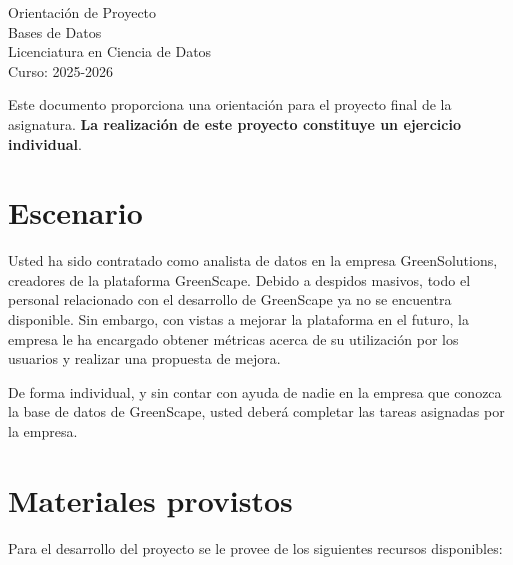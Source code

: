 \documentclass[10pt]{article}
\date{\displaydate{date}}
\begin{document}
	
	
	\begin{centering}
		
		\huge Orientación de Proyecto \\[2mm]
		
		\small Bases de Datos\\
		Licenciatura en Ciencia de Datos\\
		Curso: 2025-2026
		
	\end{centering}
	
	\vspace{2mm}
	
	Este documento proporciona una orientación para el proyecto final de la asignatura. \textbf{La realización de este proyecto constituye un ejercicio individual}.
	
	\section*{Escenario}
	
	Usted ha sido contratado como analista de datos en la empresa GreenSolutions, creadores de la plataforma GreenScape. Debido a despidos masivos, todo el personal relacionado con el desarrollo de GreenScape ya no se encuentra disponible. Sin embargo, con vistas a mejorar la plataforma en el futuro, la empresa le ha encargado obtener métricas acerca de su utilización por los usuarios y realizar una propuesta de mejora. 
	
	De forma individual, y sin contar con ayuda de nadie en la empresa que conozca la base de datos de GreenScape, usted deberá completar las tareas asignadas por la empresa.
	
	\section*{Materiales provistos}
	
	Para el desarrollo del proyecto se le provee de los siguientes recursos disponibles:
	
\end{document}
